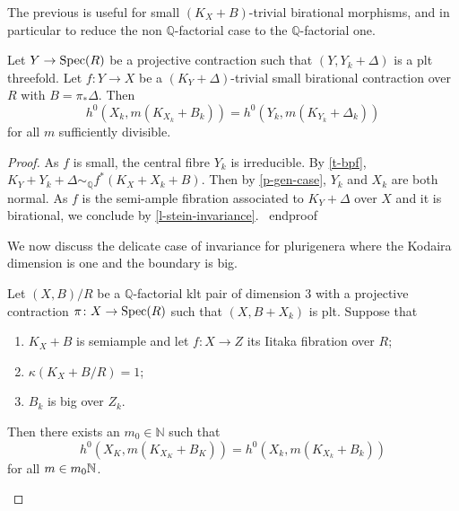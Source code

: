 	The previous is useful for small $(K_{X}+B)$-trivial birational morphisms, and in particular to reduce the non $\mathbb{Q}$-factorial case to the $\mathbb{Q}$-factorial one.
	
	
	\begin{lemma}\label{l-reduce-Q-fac}
		Let $Y \to \operatorname{Spec}(R)$ be a projective contraction such that $(Y,Y_{k}+\Delta)$ is a plt threefold.
		Let $f \colon Y \to X$ be a $(K_{Y}+\Delta)$-trivial small birational contraction over $R$ with $B=\pi_{*}\Delta$. 
		Then
		$$h^{0}(X_{k},m(K_{X_k}+B_{k}))= h^{0}(Y_{k},m(K_{Y_{k}}+\Delta_{k}))$$ 
		for all $m$ sufficiently divisible. 
	\end{lemma}

	\begin{proof}
	
	As $f$ is small, the central fibre $Y_k$ is irreducible. 
	By \autoref{t-bpf},	$K_Y+Y_k+\Delta \sim_{\mathbb{Q}} f^*(K_X+X_k+B)$.
	Then by \autoref{p-gen-case}, $Y_k$ and $X_k$ are both normal.
	As $f$ is the semi-ample fibration associated to $K_Y+\Delta$ over $X$ and it is birational, we conclude by \autoref{l-stein-invariance}.
\	end{proof}

	We now discuss the delicate case of invariance for plurigenera where the Kodaira dimension is one and the boundary is big.
	
	
	\begin{proposition}\label{p-1-case}
		
		Let $(X,B)/R$ be a $\mathbb{Q}$-factorial klt pair of dimension $3$ with a projective contraction $\pi \colon X \to \operatorname{Spec}(R)$ such that $(X,B+X_{k})$ is plt. Suppose that
		\begin{enumerate}
			\item $K_X+B$ is semiample and let $f\colon X \to Z$ its Iitaka fibration over $R$;
			\item $\kappa(K_X+B/R)=1$;
			\item $B_{k}$ is big over $Z_{k}$.
		\end{enumerate}
		Then there exists an $m_{0} \in \mathbb{N}$  such that 
		$$h^0(X_K,m(K_{X_K}+B_K))=h^0(X_k,m(K_{X_k}+B_k))$$
		for all $m\in m_0\mathbb{N}$.	
	\end{proposition}
	

\end{proof}
